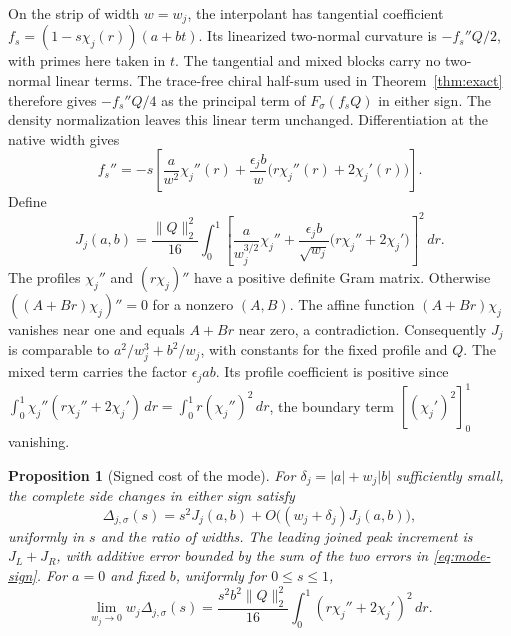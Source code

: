 \documentclass[11pt,letterpaper]{article}
\numberwithin{equation}{section}
\newtheorem{proposition}[theorem]{Proposition}
\begin{document}
On the strip of width \(w=w_j\), the interpolant has tangential
coefficient \(f_s=(1-s\chi_j(r))(a+bt)\). Its linearized
two-normal curvature is \(-f_s''Q/2\), with primes here taken
in \(t\). The tangential and mixed blocks carry no two-normal
linear terms. The trace-free chiral half-sum used in
Theorem~\ref{thm:exact} therefore gives
\(-f_s''Q/4\) as the principal term of \(F_\sigma(f_s Q)\)
in either sign. The density normalization leaves this linear
term unchanged. Differentiation at the native width gives
\[
 f_s''=-s\left[
  \frac{a}{w^2}\chi_j''(r)
  +\frac{\epsilon_j b}{w}\bigl(r\chi_j''(r)+2\chi_j'(r)\bigr)
 \right].
\]
Define
\begin{equation}
 J_j(a,b)=\frac{\|Q\|_2^2}{16}\int_0^1
 \left[
  \frac{a}{w_j^{3/2}}\chi_j''
  +\frac{\epsilon_j b}{\sqrt{w_j}}\bigl(r\chi_j''+2\chi_j'\bigr)
 \right]^2\,dr .
 \label{eq:gram}
\end{equation}
The profiles \(\chi_j''\) and \((r\chi_j)''\) have a positive
definite Gram matrix. Otherwise \(((A+Br)\chi_j)''=0\) for
a nonzero \((A,B)\). The affine function \((A+Br)\chi_j\)
vanishes near one and equals \(A+Br\) near zero, a contradiction.
Consequently \(J_j\) is comparable to \(a^2/w_j^3+b^2/w_j\),
with constants for the fixed profile and \(Q\). The mixed term
carries the factor \(\epsilon_j ab\). Its profile coefficient
is positive since
\(\int_0^1\chi_j''(r\chi_j''+2\chi_j')\,dr
=\int_0^1r(\chi_j'')^2\,dr\), the boundary term
\([(\chi_j')^2]_0^1\) vanishing.

\begin{proposition}[Signed cost of the mode]\label{prop:mode}
For \(\delta_j=|a|+w_j|b|\) sufficiently small, the complete
side changes in either sign satisfy
\begin{equation}
 \Delta_{j,\sigma}(s)=s^2 J_j(a,b)
             +O\bigl((w_j+\delta_j)J_j(a,b)\bigr) ,
 \label{eq:mode-sign}
\end{equation}
uniformly in \(s\) and the ratio of widths. The leading joined
peak increment is \(J_L+J_R\), with additive error bounded by
the sum of the two errors in \eqref{eq:mode-sign}.
For \(a=0\) and fixed \(b\), uniformly for \(0\le s\le1\),
\[
 \lim_{w_j\to0} w_j\Delta_{j,\sigma}(s)=
 \frac{s^2 b^2\|Q\|_2^2}{16}
 \int_0^1 (r\chi_j''+2\chi_j')^2\,dr .
\]
\end{proposition}
\end{document}
